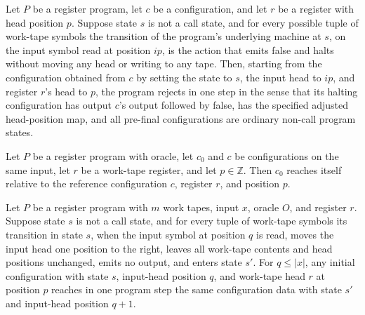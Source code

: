 \begin{lemma}
\label{Complexity.LogProg.rejects_one}
\leanok
{}
Let $P$ be a register program, let $c$ be a configuration, and let $r$ be a register
with head position $p$. Suppose state $s$ is not a call state, and for every possible
tuple of work-tape symbols the transition of the program's underlying machine at $s$, on
the input symbol read at position $ip$, is the action that emits false and halts without
moving any head or writing to any tape. Then, starting from the configuration obtained
from $c$ by setting the state to $s$, the input head to $ip$, and register $r$'s head to
$p$, the program rejects in one step in the sense that its halting configuration has
output $c$'s output followed by false, has the specified adjusted head-position map, and
all pre-final configurations are ordinary non-call program states.
\end{lemma}

\begin{lemma}
\label{Complexity.LogProg.Reaches.refl}
\leanok
{}
Let $P$ be a register program with oracle, let $c_0$ and $c$ be configurations on the
same input, let $r$ be a work-tape register, and let $p\in\mathbb{Z}$. Then $c_0$
reaches itself relative to the reference configuration $c$, register $r$, and position
$p$.
\end{lemma}

\begin{lemma}
\label{Complexity.LogProg.reaches_right}
\leanok
{}
Let $P$ be a register program with $m$ work tapes, input $x$, oracle $O$, and register
$r$. Suppose state $s$ is not a call state, and for every tuple of work-tape symbols its
transition in state $s$, when the input symbol at position $q$ is read, moves the input
head one position to the right, leaves all work-tape contents and head positions
unchanged, emits no output, and enters state $s'$. For $q\le |x|$, any initial
configuration with state $s$, input-head position $q$, and work-tape head $r$ at
position $p$ reaches in one program step the same configuration data with state $s'$ and
input-head position $q+1$.
\end{lemma}

